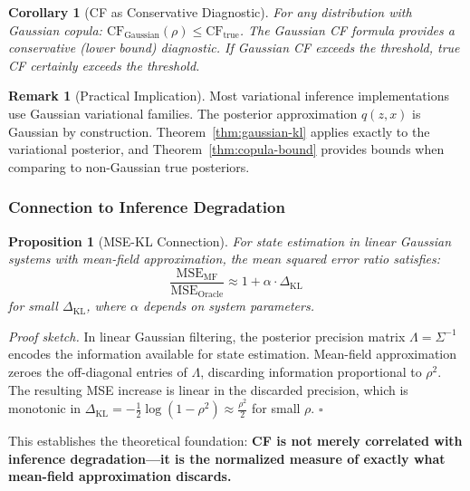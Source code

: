 \documentclass[10pt]{article} %
\theoremstyle{plain}
\newtheorem{proposition}[theorem]{Proposition}
\newtheorem{corollary}[theorem]{Corollary}
\theoremstyle{definition}
\newtheorem{remark}[theorem]{Remark}
\newcommand{\CF}{\mathrm{CF}}
\begin{document}
\begin{corollary}[CF as Conservative Diagnostic]
For any distribution with Gaussian copula: $\CF_{\text{Gaussian}}(\rho) \leq \CF_{\text{true}}$. The Gaussian CF formula provides a conservative (lower bound) diagnostic. If Gaussian CF exceeds the threshold, true CF certainly exceeds the threshold.
\end{corollary}

\begin{remark}[Practical Implication]
Most variational inference implementations use Gaussian variational families. The posterior approximation $q(z, x)$ is Gaussian by construction. Theorem~\ref{thm:gaussian-kl} applies exactly to the variational posterior, and Theorem~\ref{thm:copula-bound} provides bounds when comparing to non-Gaussian true posteriors.
\end{remark}

\subsubsection{Connection to Inference Degradation}

\begin{proposition}[MSE-KL Connection]
\label{prop:mse-kl}
For state estimation in linear Gaussian systems with mean-field approximation, the mean squared error ratio satisfies:
\begin{equation}
\frac{\text{MSE}_{\text{MF}}}{\text{MSE}_{\text{Oracle}}} \approx 1 + \alpha \cdot \Delta_{\text{KL}}
\end{equation}
for small $\Delta_{\text{KL}}$, where $\alpha$ depends on system parameters.
\end{proposition}

\noindent \emph{Proof sketch.} In linear Gaussian filtering, the posterior precision matrix $\Lambda = \Sigma^{-1}$ encodes the information available for state estimation. Mean-field approximation zeroes the off-diagonal entries of $\Lambda$, discarding information proportional to $\rho^2$. The resulting MSE increase is linear in the discarded precision, which is monotonic in $\Delta_{\text{KL}} = -\frac{1}{2}\log(1-\rho^2) \approx \frac{\rho^2}{2}$ for small $\rho$. $\square$

\noindent This establishes the theoretical foundation: \textbf{CF is not merely correlated with inference degradation---it is the normalized measure of exactly what mean-field approximation discards.}

\end{document}
